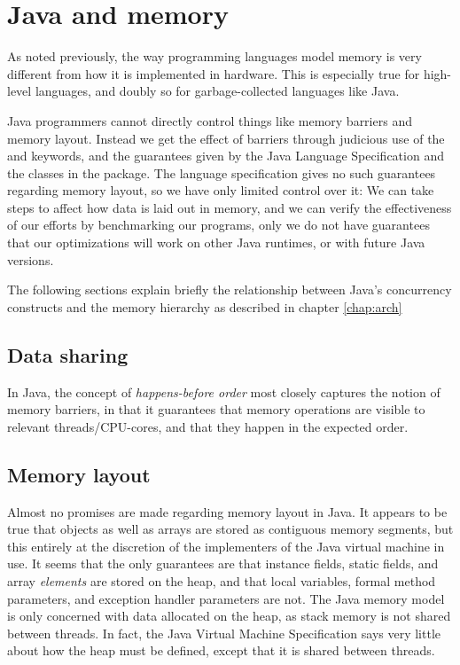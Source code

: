\chapter{Java and memory}

As noted previously, the way programming languages model memory is very
different from how it is implemented in hardware. This is especially true for
high-level languages, and doubly so for garbage-collected languages like Java.

Java programmers cannot directly control things like memory barriers and memory
layout. Instead we get the effect of barriers through judicious use of the
 and  keywords, and the guarantees given by
the Java Language Specification\cite{javaspec} and the classes in the
 package.
The language specification gives no such guarantees regarding memory
layout, so we have only limited control over it: We can take steps to affect how
data is laid out in memory, and we can verify the effectiveness of our efforts
by benchmarking our programs, only we do not have guarantees that our
optimizations will work on other Java runtimes, or with future Java versions.

The following sections explain briefly the relationship between Java's
concurrency constructs and the memory hierarchy as described in chapter
\ref{chap:arch}

\section{Data sharing}
In Java, the concept of \textit{happens-before order} most closely captures the
notion of memory barriers, in that it guarantees that memory operations are
visible to relevant threads/CPU-cores, and that they happen in the expected
order.

\section{Memory layout}
Almost no promises are made regarding memory layout in Java. It appears to be
true that objects as well as arrays are stored as contiguous memory segments,
but this entirely at the discretion of the implementers of the Java virtual
machine in use. It seems that the only guarantees are that instance
fields, static fields, and array \textit{elements} are stored on the heap, and
that local variables, formal method parameters, and exception handler parameters
are not\cite[chapter~17]{javaspec}\cite[chapter~2]{jvmspec}. The Java memory
model is only concerned with data allocated on the heap, as stack memory is not
shared between threads. In fact, the Java Virtual Machine
Specification\cite{jvmspec} says very little about how the heap must be defined,
except that it is shared between threads.


